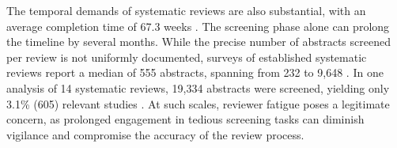 \documentclass{article}
\begin{document}
The temporal demands of systematic reviews are also substantial, with an average completion time of 67.3 weeks \cite{borah_analysis_2017}. The screening phase alone can prolong the timeline by several months. While the precise number of abstracts screened per review is not uniformly documented, surveys of established systematic reviews report a median of 555 abstracts, spanning from 232 to 9,648 \cite{nama_successful_2021}. In one analysis of 14 systematic reviews, 19,334 abstracts were screened, yielding only 3.1\% (605) relevant studies \cite{nama_successful_2021}. At such scales, reviewer fatigue poses a legitimate concern, as prolonged engagement in tedious screening tasks can diminish vigilance and compromise the accuracy of the review process.




\end{document}
